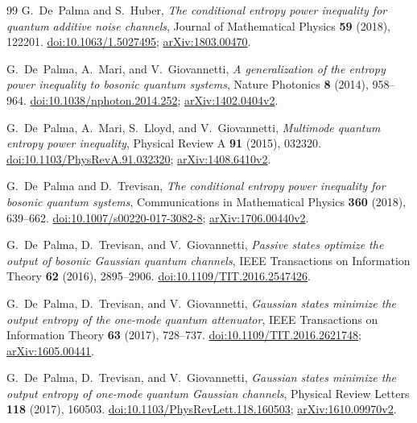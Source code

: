 \begin{thebibliography}{99}
G.~De~Palma and S.~Huber,
\emph{The conditional entropy power inequality for quantum additive noise channels},
Journal of Mathematical Physics \textbf{59} (2018), 122201.
\href{https://doi.org/10.1063/1.5027495}{doi:10.1063/1.5027495};
\href{https://arxiv.org/abs/1803.00470}{arXiv:1803.00470}.

G.~De~Palma, A.~Mari, and V.~Giovannetti,
\emph{A generalization of the entropy power inequality to bosonic quantum systems},
Nature Photonics \textbf{8} (2014), 958--964.
\href{https://doi.org/10.1038/nphoton.2014.252}{doi:10.1038/nphoton.2014.252};
\href{https://arxiv.org/abs/1402.0404v2}{arXiv:1402.0404v2}.

G.~De~Palma, A.~Mari, S.~Lloyd, and V.~Giovannetti,
\emph{Multimode quantum entropy power inequality},
Physical Review A \textbf{91} (2015), 032320.
\href{https://doi.org/10.1103/PhysRevA.91.032320}{doi:10.1103/PhysRevA.91.032320};
\href{https://arxiv.org/abs/1408.6410v2}{arXiv:1408.6410v2}.

G.~De~Palma and D.~Trevisan,
\emph{The conditional entropy power inequality for bosonic quantum systems},
Communications in Mathematical Physics \textbf{360} (2018), 639--662.
\href{https://doi.org/10.1007/s00220-017-3082-8}{doi:10.1007/s00220-017-3082-8};
\href{https://arxiv.org/abs/1706.00440v2}{arXiv:1706.00440v2}.

G.~De~Palma, D.~Trevisan, and V.~Giovannetti,
\emph{Passive states optimize the output of bosonic Gaussian quantum channels},
IEEE Transactions on Information Theory \textbf{62} (2016), 2895--2906.
\href{https://doi.org/10.1109/TIT.2016.2547426}{doi:10.1109/TIT.2016.2547426}.

G.~De~Palma, D.~Trevisan, and V.~Giovannetti,
\emph{Gaussian states minimize the output entropy of the one-mode quantum attenuator},
IEEE Transactions on Information Theory \textbf{63} (2017), 728--737.
\href{https://doi.org/10.1109/TIT.2016.2621748}{doi:10.1109/TIT.2016.2621748};
\href{https://arxiv.org/abs/1605.00441}{arXiv:1605.00441}.

G.~De~Palma, D.~Trevisan, and V.~Giovannetti,
\emph{Gaussian states minimize the output entropy of one-mode quantum Gaussian channels},
Physical Review Letters \textbf{118} (2017), 160503.
\href{https://doi.org/10.1103/PhysRevLett.118.160503}{doi:10.1103/PhysRevLett.118.160503};
\href{https://arxiv.org/abs/1610.09970v2}{arXiv:1610.09970v2}.


\end{thebibliography}
